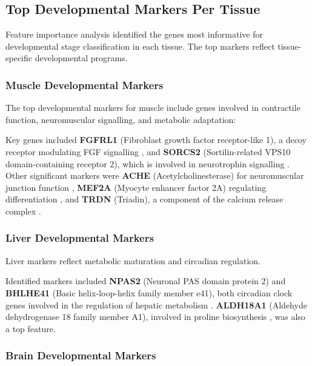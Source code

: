\subsection{Top Developmental Markers Per Tissue}

Feature importance analysis identified the genes most informative for developmental stage classification in each tissue. The top markers reflect tissue-specific developmental programs.

\subsubsection{Muscle Developmental Markers}

The top developmental markers for muscle include genes involved in contractile function, neuromuscular signalling, and metabolic adaptation:

Key genes included \textbf{FGFRL1} (Fibroblast growth factor receptor-like 1), a decoy receptor modulating FGF signalling \parencite{amann_fgfrl1_2014}, and \textbf{SORCS2} (Sortilin-related VPS10 domain-containing receptor 2), which is involved in neurotrophin signalling \parencite{thomasen_sorcs2_2023}. Other significant markers were \textbf{ACHE} (Acetylcholinesterase) for neuromuscular junction function \parencite{rotundo_expression_2003}, \textbf{MEF2A} (Myocyte enhancer factor 2A) regulating differentiation \parencite{black_transcriptional_1998}, and \textbf{TRDN} (Triadin), a component of the calcium release complex \parencite{guo_association_1995}.

\subsubsection{Liver Developmental Markers}

Liver markers reflect metabolic maturation and circadian regulation.

Identified markers included \textbf{NPAS2} (Neuronal PAS domain protein 2) and \textbf{BHLHE41} (Basic helix-loop-helix family member e41), both circadian clock genes involved in the regulation of hepatic metabolism \parencite{zhang_night-restricted_2025}. \textbf{ALDH18A1} (Aldehyde dehydrogenase 18 family member A1), involved in proline biosynthesis \parencite{marco-marin_1_2020}, was also a top feature.

\subsubsection{Brain Developmental Markers}

